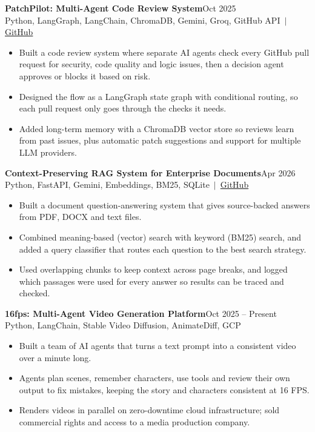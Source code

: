 \documentclass[a4paper,10pt]{article}
\newcommand{\project}[3]{\textbf{#1}\hfill #2\\{\small #3}\par\vspace{-2pt}}
\newcommand{\gap}{\vspace{5pt}}
\begin{document}
\project{PatchPilot: Multi-Agent Code Review System}{Oct 2025}{Python, LangGraph, LangChain, ChromaDB, Gemini, Groq, GitHub API \,$|$\, \href{https://github.com/nithin434/code_review}{GitHub}}
\begin{itemize}
  \item Built a code review system where separate AI agents check every GitHub pull request for security, code quality and logic issues, then a decision agent approves or blocks it based on risk.
  \item Designed the flow as a LangGraph state graph with conditional routing, so each pull request only goes through the checks it needs.
  \item Added long-term memory with a ChromaDB vector store so reviews learn from past issues, plus automatic patch suggestions and support for multiple LLM providers.
\end{itemize}
\gap

\project{Context-Preserving RAG System for Enterprise Documents}{Apr 2026}{Python, FastAPI, Gemini, Embeddings, BM25, SQLite \,$|$\, \href{https://github.com/nithin434/Context-Preserving}{GitHub}}
\begin{itemize}
  \item Built a document question-answering system that gives source-backed answers from PDF, DOCX and text files.
  \item Combined meaning-based (vector) search with keyword (BM25) search, and added a query classifier that routes each question to the best search strategy.
  \item Used overlapping chunks to keep context across page breaks, and logged which passages were used for every answer so results can be traced and checked.
\end{itemize}
\gap

\project{16fps: Multi-Agent Video Generation Platform}{Oct 2025 -- Present}{Python, LangChain, Stable Video Diffusion, AnimateDiff, GCP}
\begin{itemize}
  \item Built a team of AI agents that turns a text prompt into a consistent video over a minute long.
  \item Agents plan scenes, remember characters, use tools and review their own output to fix mistakes, keeping the story and characters consistent at 16 FPS.
  \item Renders videos in parallel on zero-downtime cloud infrastructure; sold commercial rights and access to a media production company.
\end{itemize}
\gap
\end{document}
